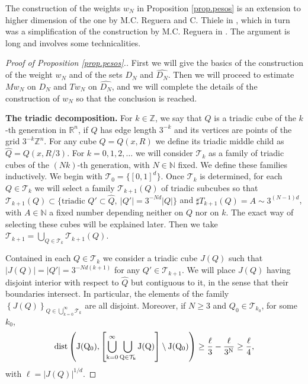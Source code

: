 \documentclass[11pt]{amsart}
\theoremstyle{definition}
\begin{document}
\bigskip

The construction of the weights $w_N$ in Proposition \ref{prop.pesos} is an extension to higher dimension of the one by M.C. Reguera and C. Thiele in \cite{RegueraThiele}, which in turn was a simplification of the construction by M.C. Reguera in \cite{Reguera}. The argument is long and involves some technicalities.

\bigskip

\begin{proof}[Proof of Proposition \ref{prop.pesos}.]  First we will give the basics of the construction of the weight $w_N$ and of the sets $D_N$ and $\widehat{D_N}$. Then we will proceed to estimate $Mw_N$ on $D_N$ and $Tw_N$ on $\widehat{D_N}$, and we will complete the details of the construction of $w_N$ so that the conclusion is reached.

\bigskip

\textbf{The triadic decomposition.} For $k\in\mathbb Z$, we say that $Q$ is a triadic cube of the $k$-th generation in ${\mathbb{R}}^n$, if $Q$ has edge length $3^{-k}$ and its vertices are points of the grid $3^{-k} \mathbb Z^n$. For any cube $Q=Q(x,R)$ we define its triadic middle child as $\widehat{Q}=Q(x,R/3)$. For $k=0,1,2,\ldots$ we will consider $\mathcal T_k$ as a family of triadic cubes of the $(Nk)$-th generation, with $N\in\mathbb N$ fixed. We define these families inductively. We begin with $\mathcal T_0=\{[0,1]^d\}$. Once $\mathcal T_k$ is determined, for each $Q\in\mathcal T_k$ we will select a family $\mathcal T_{k+1}(Q)$ of triadic subcubes so that $\mathcal T_{k+1}(Q)\subset \{ \mbox{triadic } Q' \subset \widehat{Q}, \ |Q'|=3^{-Nd}|Q|\}$ and $\sharp T_{k+1}(Q)= A\sim 3^{(N-1)d}$, with $A\in\mathbb N$ a fixed number depending neither on $Q$ nor on $k$. The exact way of selecting these cubes will be explained later. Then we take $\mathcal T_{k+1}=\bigcup_{Q\in \mathcal T_k} \mathcal T_{k+1}(Q)$. 

\bigskip

Contained in each $Q\in\mathcal T_k$ we consider a triadic cube $J(Q)$ such that $|J(Q)|=|Q'|=3^{-Nd(k+1)}$ for any $Q'\in \mathcal T_{k+1}$. We will place $J(Q)$ having disjoint interior with respect to $\widehat{Q}$ but contiguous to it, in the sense that their boundaries intersect. In particular, the elements of the family $\displaystyle  \left\{J(Q)\right\}_{Q\in\bigcup_{k=0}^\infty  \mathcal T_k}$ are all disjoint. Moreover, if $N\ge 3$ and $Q_0\in \mathcal T_{k_0}$, for some $k_0$, 
\begin{equation}\label{distance}
\rm{dist}\left(J(Q_0),\left[\bigcup_{k=0}^\infty \bigcup_{Q\in \mathcal T_{k}}J(Q)\right]\setminus J(Q_0)\right)
\geq \frac{\ell}3-\frac{\ell}{3^N}\geq \frac{\ell}4,
\end{equation}
with $\ell=|J(Q)|^{1/d}$.


\end{proof}
\end{document}
